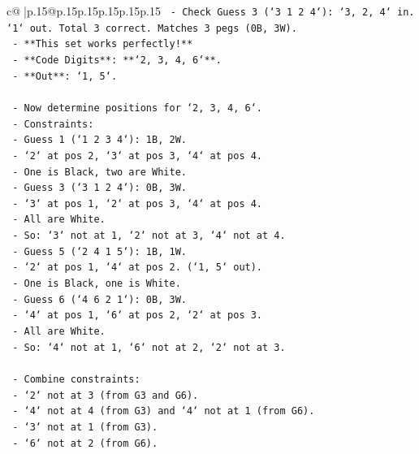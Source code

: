 \documentclass{article}
\begin{document}
{\begin{supertabular}{c@{$\;$}|p{.15\linewidth}@{}p{.15\linewidth}p{.15\linewidth}p{.15\linewidth}p{.15\linewidth}p{.15\linewidth}}
{{{\texttt{        {-} Check Guess 3 (`3 1 2 4`): `3, 2, 4` in. `1` out. Total 3 correct. Matches 3 pegs (0B, 3W).} \\
\texttt{        {-} **This set works perfectly!**} \\
\texttt{        {-} **Code Digits**: **`2, 3, 4, 6`**.} \\
\texttt{        {-} **Out**: `1, 5`.} \\
\\ 
\texttt{    {-} Now determine positions for `2, 3, 4, 6`.} \\
\texttt{    {-} Constraints:} \\
\texttt{        {-} Guess 1 (`1 2 3 4`): 1B, 2W.} \\
\texttt{            {-} `2` at pos 2, `3` at pos 3, `4` at pos 4.} \\
\texttt{            {-} One is Black, two are White.} \\
\texttt{        {-} Guess 3 (`3 1 2 4`): 0B, 3W.} \\
\texttt{            {-} `3` at pos 1, `2` at pos 3, `4` at pos 4.} \\
\texttt{            {-} All are White.} \\
\texttt{            {-} So: `3` not at 1, `2` not at 3, `4` not at 4.} \\
\texttt{        {-} Guess 5 (`2 4 1 5`): 1B, 1W.} \\
\texttt{            {-} `2` at pos 1, `4` at pos 2. (`1, 5` out).} \\
\texttt{            {-} One is Black, one is White.} \\
\texttt{        {-} Guess 6 (`4 6 2 1`): 0B, 3W.} \\
\texttt{            {-} `4` at pos 1, `6` at pos 2, `2` at pos 3.} \\
\texttt{            {-} All are White.} \\
\texttt{            {-} So: `4` not at 1, `6` not at 2, `2` not at 3.} \\
\\ 
\texttt{    {-} Combine constraints:} \\
\texttt{        {-} `2` not at 3 (from G3 and G6).} \\
\texttt{        {-} `4` not at 4 (from G3) and `4` not at 1 (from G6).} \\
\texttt{        {-} `3` not at 1 (from G3).} \\
\texttt{        {-} `6` not at 2 (from G6).} \\
\\ 
}}}
\end{supertabular}}
\end{document}
